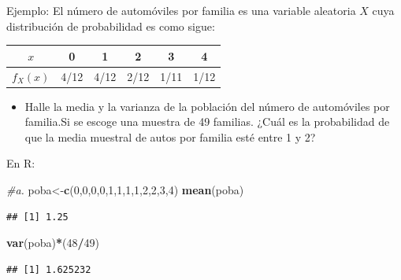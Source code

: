 \documentclass[
  ignorenonframetext,
]{beamer}
\newenvironment{Shaded}{\begin{snugshade}}{\end{snugshade}}
\newcommand{\CommentTok}[1]{\textcolor[rgb]{0.56,0.35,0.01}{\textit{#1}}}
\newcommand{\DecValTok}[1]{\textcolor[rgb]{0.00,0.00,0.81}{#1}}
\newcommand{\KeywordTok}[1]{\textcolor[rgb]{0.13,0.29,0.53}{\textbf{#1}}}
\newcommand{\NormalTok}[1]{#1}
\newcommand{\OperatorTok}[1]{\textcolor[rgb]{0.81,0.36,0.00}{\textbf{#1}}}
\begin{document}
\begin{frame}[fragile]{}

\justifying

Ejemplo: El número de automóviles por familia es una variable aleatoria
\(X\) cuya distribución de probabilidad es como sigue:

\begin{center}
\begin{tabular}{ |c |c |c |c |c| c|}
\hline
 $x$  & 0 & 1 & 2 &3 & 4\\ \hline
$f_X(x)$ & 4/12  & 4/12 & 2/12 & 1/11& 1/12 \\ \hline

 \end{tabular}
\end{center}

\begin{itemize}\justifying
  \item  Halle la media y la varianza de la población del número de automóviles por familia.Si se escoge una muestra de 49 familias. ¿Cuál es la probabilidad de que la media muestral de autos por familia esté entre 1 y 2?
\end{itemize}

En R:

\begin{Shaded}
\begin{Highlighting}[]
\CommentTok{#a.}
\NormalTok{poba<-}\KeywordTok{c}\NormalTok{(}\DecValTok{0}\NormalTok{,}\DecValTok{0}\NormalTok{,}\DecValTok{0}\NormalTok{,}\DecValTok{0}\NormalTok{,}\DecValTok{1}\NormalTok{,}\DecValTok{1}\NormalTok{,}\DecValTok{1}\NormalTok{,}\DecValTok{1}\NormalTok{,}\DecValTok{2}\NormalTok{,}\DecValTok{2}\NormalTok{,}\DecValTok{3}\NormalTok{,}\DecValTok{4}\NormalTok{)}
\KeywordTok{mean}\NormalTok{(poba)}
\end{Highlighting}
\end{Shaded}

\begin{verbatim}
## [1] 1.25
\end{verbatim}

\begin{Shaded}
\begin{Highlighting}[]
\KeywordTok{var}\NormalTok{(poba)}\OperatorTok{*}\NormalTok{(}\DecValTok{48}\OperatorTok{/}\DecValTok{49}\NormalTok{)}
\end{Highlighting}
\end{Shaded}

\begin{verbatim}
## [1] 1.625232
\end{verbatim}

\end{frame}
\end{document}
